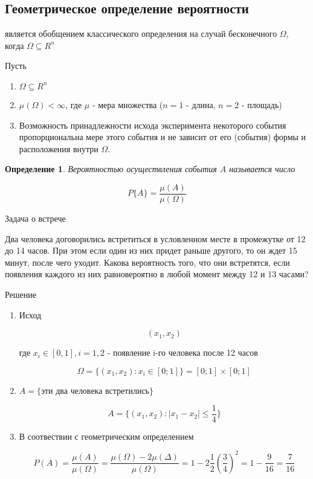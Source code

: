 \documentclass[a4paper, 14pt]{report}
\newtheorem{defenition}{Определение}[section]
\begin{document}
\subsection{Геометрическое определение вероятности}

является обобщением классического определения на случай бесконечного $\Omega$, когда $\Omega \subseteq R^n$

Пусть

\begin{enumerate}
    \item $\Omega \subseteq R^n$
    \item $\mu(\Omega) < \infty$, где $\mu$ - мера множества ($n=1$ - длина, $n=2$ - площадь)
    \item Возможность принадлежности исхода эксперимента некоторого события пропорциональна мере этого события и не зависит от его (события) формы и расположения внутри $\Omega$.
\end{enumerate}

\begin{defenition}
    Вероятностью осуществления события $A$ называется число

    $$
    P\{A\} = \frac{\mu(A)}{\mu(\Omega)}
    $$
\end{defenition}

Задача о встрече

Два человека договорились встретиться в условленном месте в промежутке от 12 до 14 часов. При этом если один из них придет раньше другого, то он ждет 15 минут, после чего уходит. Какова вероятность того, что они встретятся, если появления каждого из них равновероятно в любой момент между 12 и 13 часами?

Решение

\begin{enumerate}
    \item Исход

        $$
        (x_1,x_2)
        $$

        где $x_i \in [0,1], i = 1,2$ - появление i-го человека после 12 часов

        $$
        \Omega = \{ (x_1,x_2) : x_i \in [0;1]\} = [0;1] \times [0;1]
        $$

    \item $A = \{\text{эти два человека встретились}\}$

        $$
        A = \{ (x_1,x_2) : |x_1-x_2| \le \frac{1}{4}\}
        $$

    \item В соотвествии с геометрическим определением

        $$
        P(A) = \frac{\mu(A)}{\mu(\Omega)} = \frac{\mu(\Omega) - 2 \mu(\Delta)}{\mu(\Omega)} = 1 - 2 \frac{1}{2} (\frac{3}{4})^2 = 1 - \frac{9}{16} = \frac{7}{16}
        $$
\end{enumerate}
\end{document}
